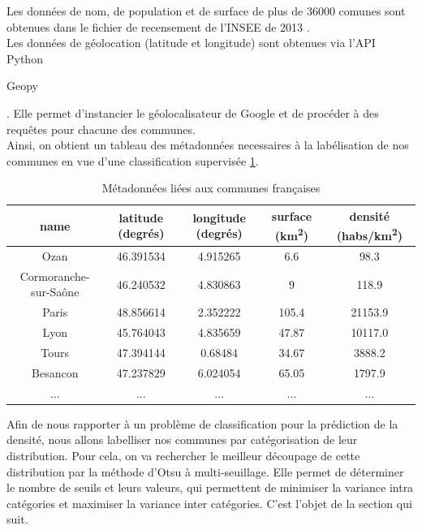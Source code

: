 \documentclass{book}
\begin{document}
Les données de nom, de population et de surface de plus de 36000 comunes sont obtenues dans le fichier de recensement de l'INSEE de 2013 \cite{insee_pop2013}.\\
Les données de géolocation (latitude et longitude) sont obtenues via l'API Python \begin{itshape}Geopy\end{itshape} \cite{geopy}. Elle permet d'instancier 
le géolocalisateur de Google et de procéder à des requêtes pour chacune des communes.\\

Ainsi, on obtient un tableau des métadonnées necessaires à la labélisation de nos communes en vue d'une classification supervisée \ref{tab_meta}.

\begin{table}[H]
\begin{center}
\begin{adjustbox}{max width=\textwidth}
{
\begin{tabular}{|c|c|c|c|c|}
\hline 
name & latitude (degrés) & longitude (degrés) & surface (km\textsuperscript{2}) & densité (habs/km\textsuperscript{2}) \\
\hline
Ozan & 46.391534 & 4.915265 & 6.6 & 98.3\\
\hline 
Cormoranche-sur-Sa\^{o}ne & 46.240532 & 4.830863 & 9 & 118.9\\
\hline 
Paris & 48.856614 & 2.352222 & 105.4 & 21153.9\\
\hline
Lyon & 45.764043 & 4.835659 & 47.87 & 10117.0\\
\hline
Tours & 47.394144 & 0.68484 & 34.67 & 3888.2\\
\hline
Besancon & 47.237829 & 6.024054 & 65.05 & 1797.9\\
\hline 
... & ... & ... & ... & ... \\
\hline
\end{tabular}
}
\end{adjustbox}
\end{center}
\caption{Métadonnées liées aux communes françaises}
\label{tab_meta}
\end{table}

Afin de nous rapporter à un problème de classification pour la prédiction de la densité, nous allons labelliser nos communes par catégorisation de leur distribution.
Pour cela, on va rechercher le meilleur découpage de cette distribution par la méthode d'Otsu à multi-seuillage. Elle permet de déterminer le nombre de seuils et leurs
 valeurs, qui permettent de minimiser la variance intra catégories et maximiser la variance inter catégories. C'est l'objet de la section qui suit.
\end{document}
